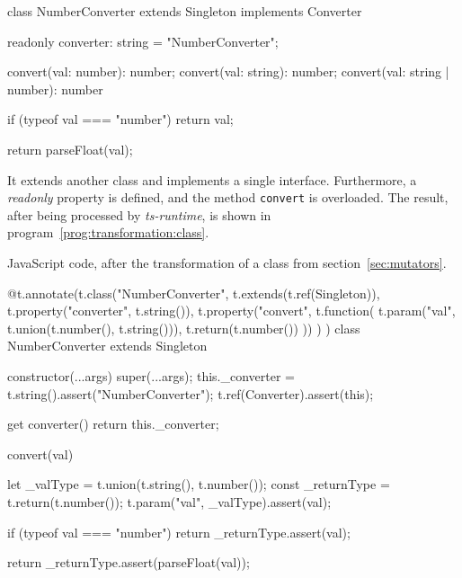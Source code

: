 \begin{JsCode}
class NumberConverter extends Singleton implements Converter {

  readonly converter: string = "NumberConverter";

  convert(val: number): number;
  convert(val: string): number;
  convert(val: string | number): number {
    if (typeof val === "number") {
      return val;
    }
        
    return parseFloat(val);
  }

}
\end{JsCode}
It extends another class and implements a single interface. Furthermore, a \emph{readonly} property is defined, and the method \texttt{convert} is overloaded. The result, after being processed by \emph{ts-runtime}, is shown in program~\ref{prog:transformation:class}.
\begin{program}
\caption{JavaScript code, after the transformation of a class from section~\ref{sec:mutators}.}
\label{prog:transformation:class}
\begin{JsCode}
@t.annotate(t.class("NumberConverter", t.extends(t.ref(Singleton)),
  t.property("converter", t.string()),
  t.property("convert",
    t.function(
      t.param("val", t.union(t.number(), t.string())),
      t.return(t.number())
    ))
  )
)
class NumberConverter extends Singleton {

  constructor(...args) {
    super(...args);
    this._converter = t.string().assert("NumberConverter");
    t.ref(Converter).assert(this);
  }
  
  get converter() {
    return this._converter;
  }
  
  convert(val) {
    let _valType = t.union(t.string(), t.number());
    const _returnType = t.return(t.number());
    t.param("val", _valType).assert(val);
    
    if (typeof val === "number") {
      return _returnType.assert(val);
    }
    
    return _returnType.assert(parseFloat(val));
  }
  
}
\end{JsCode}
\end{program}

